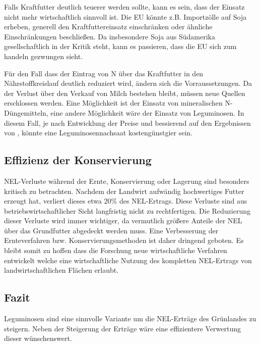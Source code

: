 Falls Kraftfutter deutlich teuerer werden sollte, kann es sein, dass der Einsatz nicht mehr wirtschaftlich sinnvoll ist.
Die \ac{EU} könnte z.B. Importzölle auf Soja erheben, generell den Kraftfuttereinsatz einschränken oder ähnliche Einschränkungen beschließen.
Da insbesondere Soja aus Südamerika gesellschaftlich in der Kritik steht, kann es passieren, dass die \ac{EU} sich zum handeln gezwungen sieht.

Für den Fall dass der Eintrag von N über das Kraftfutter in den Nährstoffkreislauf deutlich reduziert wird, ändern sich die Vorraussetzungen.
Da der Verlust über den Verkauf von Milch bestehen bleibt, müssen neue Quellen erschlossen werden.
Eine Möglichkeit ist der Einsatz von mineralischen N-Düngemitteln, eine andere Möglichkeit wäre der Einsatz von Leguminosen.
In diesem Fall, je nach Entwicklung der Preise und bessierend auf den Ergebnissen von \textcite[33-36]{weggler2050leguminosen}, könnte eine Leguminosennachsaat kostengünstgier sein.


\subsection{Effizienz der Konservierung}
\label{sub:konservierung}
\ac{NEL}-Verluste während der Ernte, Konservierung oder Lagerung sind besonders kritisch zu betrachten.
Nachdem der Landwirt aufwändig hochwertiges Futter erzeugt hat, verliert dieses etwa 20\% des \ac{NEL}-Ertrags.
Diese Verluste sind aus betriebswirtschaftlicher Sicht langfristig nicht zu rechtfertigen.
Die Reduzierung dieser Verluste wird immer wichtiger, da vermutlich größere Anteile der \ac{NEL} über das Grundfutter abgedeckt werden muss.
Eine Verbesserung der Ernteverfahren bzw. Konservierungsmethoden ist daher dringend geboten.
Es bleibt somit zu hoffen dass die Forschung neue wirtschaftliche Verfahren entwickelt welche eine wirtschaftliche Nutzung des kompletten \ac{NEL}-Ertrags von landwirtschaftlichen Flächen erlaubt.

\subsection{Fazit}
\label{subsec:fazit}
Leguminosen sind eine sinnvolle Variante um die \ac{NEL}-Erträge des Grünlandes zu steigern.
Neben der Steigerung der Erträge wäre eine effizientere Verwertung dieser wünschenswert.
